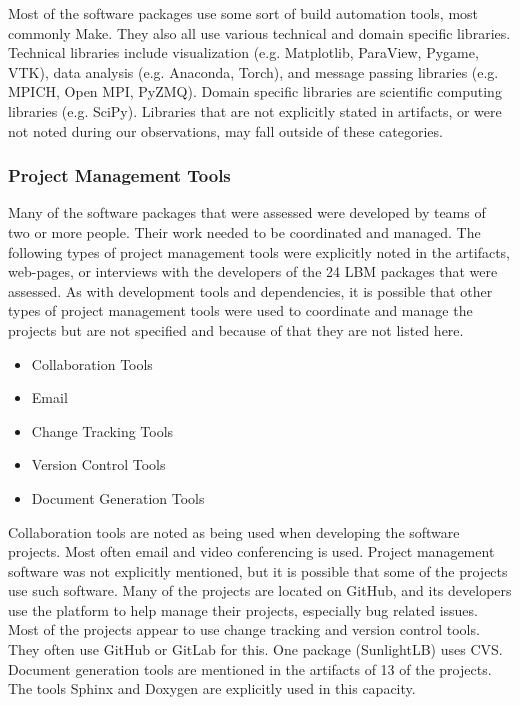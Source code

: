 \documentclass[final, 3p, times, authoryear]{elsarticle}
\begin{document}
Most of the software packages use some sort of build automation tools, most
commonly Make. They also all use various technical and domain specific
libraries. Technical libraries include visualization (e.g. Matplotlib, ParaView,
Pygame, VTK), data analysis (e.g. Anaconda, Torch), and message passing
libraries (e.g. MPICH, Open MPI, PyZMQ). Domain specific libraries are
scientific computing libraries (e.g. SciPy). Libraries that are not explicitly
stated in artifacts, or were not noted during our observations, may fall outside
of these categories. 

\subsubsection{Project Management Tools}

Many of the software packages that were assessed were developed by teams of two
or more people. Their work needed to be coordinated and managed. The following
types of project management tools were explicitly noted in the artifacts,
web-pages, or interviews with the developers of the 24 LBM packages that were
assessed. As with development tools and dependencies, it is possible that other
types of project management tools were used to coordinate and manage the
projects but are not specified and because of that they are not listed here.

	\begin{multicols}{2}	
		\begin{itemize}
			
			\item Collaboration Tools
			\item Email
			\item Change Tracking Tools
			\item Version Control Tools
			\item Document Generation Tools
		
		\end{itemize}
	\end{multicols}

Collaboration tools are noted as being used when developing the software
projects. Most often email and video conferencing is used. Project management
software was not explicitly mentioned, but it is possible that some of the
projects use such software. Many of the projects are located on GitHub, and its
developers use the platform to help manage their projects, especially bug
related issues. Most of the projects appear to use change tracking and version
control tools. They often use GitHub or GitLab for this. One package
(SunlightLB) uses CVS. Document generation tools are mentioned in the artifacts
of 13 of the projects. The tools Sphinx and Doxygen are explicitly used in this
capacity. 
\end{document}
